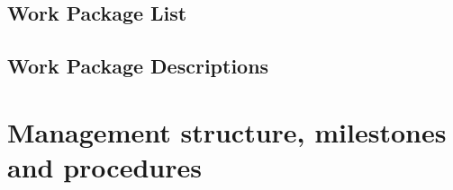 

\subsection{Work Package List}\label{sec:wplist}

\wpfigstyle{\footnotesize}



\subsection{Work Package Descriptions}\label{sec:workpackages}
\begin{workplan}
  
  
  
  
  
  
  
  
  
  
\end{workplan}

\ganttchart[draft,xscale=.45] 

\section{Management structure, milestones and procedures}

